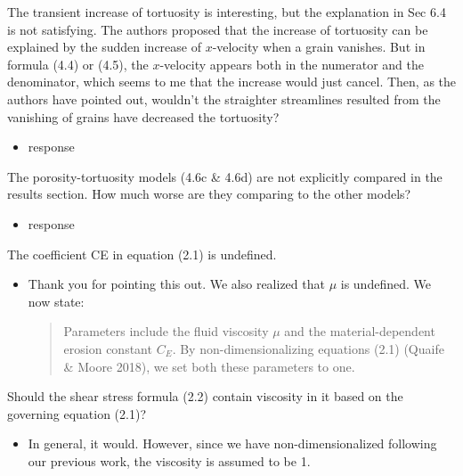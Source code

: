 \documentclass[11pt]{article}
\newcommand{\comment}[1]{{\color{blue} #1}}
\begin{document}
\noindent
\comment{The transient increase of tortuosity is interesting, but the
explanation in Sec 6.4 is not satisfying. The authors proposed that the
increase of tortuosity can be explained by the sudden increase of
$x$-velocity when a grain vanishes. But in formula (4.4) or (4.5), the
$x$-velocity appears both in the numerator and the denominator, which
seems to me that the increase would just cancel. Then, as the authors
have pointed out, wouldn't the straighter streamlines resulted from the
vanishing of grains have decreased the tortuosity?}
\begin{itemize}
  \item response
\end{itemize}

\noindent
\comment{The porosity-tortuosity models (4.6c \& 4.6d) are not
explicitly compared in the results section. How much worse are they
comparing to the other models?}
\begin{itemize}
  \item response
\end{itemize}

\noindent
\comment{The coefficient CE in equation (2.1) is undefined.}
\begin{itemize}
  \item Thank you for pointing this out. We also realized that $\mu$ is
  undefined. We now state:
  \begin{quotation}
    \noindent
    Parameters include the fluid viscosity $\mu$ and the
    material-dependent erosion constant $C_E$. By non-dimensionalizing
    equations (2.1) (Quaife \& Moore 2018), we set both these parameters
    to one.
  \end{quotation}
\end{itemize}

\noindent
\comment{Should the shear stress formula (2.2) contain viscosity in it
based on the governing equation (2.1)?}
\begin{itemize}
  \item In general, it would. However, since we have non-dimensionalized
    following our previous work, the viscosity is assumed to be 1.
\end{itemize}
\end{document}
